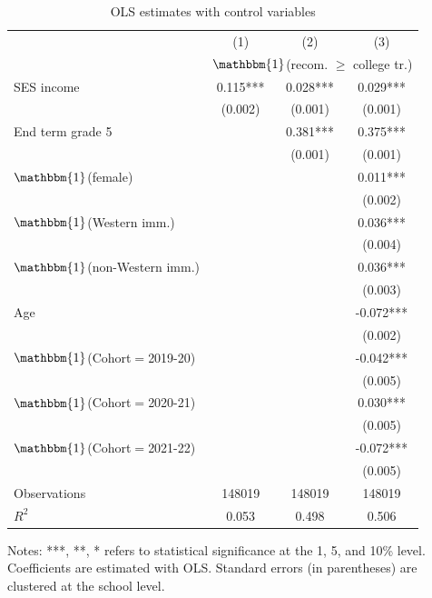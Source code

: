 \begin{table}[t!]
\begin{center}
\caption{OLS estimates with control variables}
\label{tbl:OLS_controls}
\begin{tabular}{l*{3}{c}}
\toprule\toprule
&\multicolumn{1}{c}{(1)}&\multicolumn{1}{c}{(2)}&\multicolumn{1}{c}{(3)}\\
&\multicolumn{3}{c}{$\mathbbm{1}$(recom. $\geq$ college tr.)}\\
\midrule
SES income          &       0.115***&       0.028***&      0.029***\\
                    &     (0.002)   &     (0.001)   &   (0.001)   \\
End term grade 5    &               &       0.381***&       0.375***\\
                    &               &     (0.001)   &     (0.001)   \\
$\mathbbm{1}$(female)&               &               &       0.011***\\
                    &               &               &     (0.002)   \\
$\mathbbm{1}$(Western imm.)&               &               &       0.036***\\
                    &               &              &     (0.004)   \\
$\mathbbm{1}$(non-Western imm.)&               &               &       0.036***\\
                    &               &               &     (0.003)   \\
Age                 &               &               &      -0.072***\\
                    &               &              &     (0.002)   \\
$\mathbbm{1}$(Cohort$=$2019-20)        &               &               &      -0.042***\\
                    &               &               &     (0.005)   \\
$\mathbbm{1}$(Cohort$=$2020-21)       &               &              &       0.030***\\
                    &               &               &     (0.005)   \\
$\mathbbm{1}$(Cohort$=$2021-22)        &               &               &      -0.072***\\
                    &               &               &     (0.005)   \\
[.25em]
Observations        &      148019   &      148019  &      148019   \\
\(R^{2}\)           &       0.053   &       0.498   &       0.506   \\
       \bottomrule \bottomrule
    \end{tabular}
        \begin{tablenotes}
	\footnotesize
        \item[] Notes:  ***, **, * refers to statistical significance at the 1, 5, and 10\% level. Coefficients are estimated with OLS. Standard errors (in parentheses) are clustered at the school level.
        \end{tablenotes}
\end{center}
\end{table}
